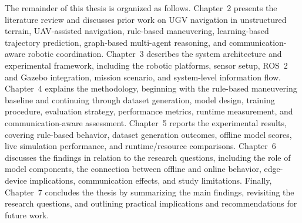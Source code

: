 The remainder of this thesis is organized as follows. Chapter~2 presents the literature review and discusses prior work on UGV navigation in unstructured terrain, UAV-assisted navigation, rule-based maneuvering, learning-based trajectory prediction, graph-based multi-agent reasoning, and communication-aware robotic coordination. Chapter~3 describes the system architecture and experimental framework, including the robotic platforms, sensor setup, ROS~2 and Gazebo integration, mission scenario, and system-level information flow. Chapter~4 explains the methodology, beginning with the rule-based maneuvering baseline and continuing through dataset generation, model design, training procedure, evaluation strategy, performance metrics, runtime measurement, and communication-aware assessment. Chapter~5 reports the experimental results, covering rule-based behavior, dataset generation outcomes, offline model scores, live simulation performance, and runtime/resource comparisons. Chapter~6 discusses the findings in relation to the research questions, including the role of model components, the connection between offline and online behavior, edge-device implications, communication effects, and study limitations. Finally, Chapter~7 concludes the thesis by summarizing the main findings, revisiting the research questions, and outlining practical implications and recommendations for future work.
